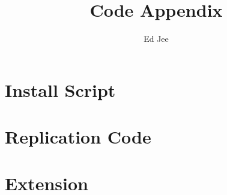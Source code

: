 \documentclass{article}
\author{Ed Jee}
\title{Code Appendix}
\begin{document}
    \maketitle
    \section{Install Script}

    
    \section{Replication Code} 
    


    \section{Extension} 
    
\end{document}
